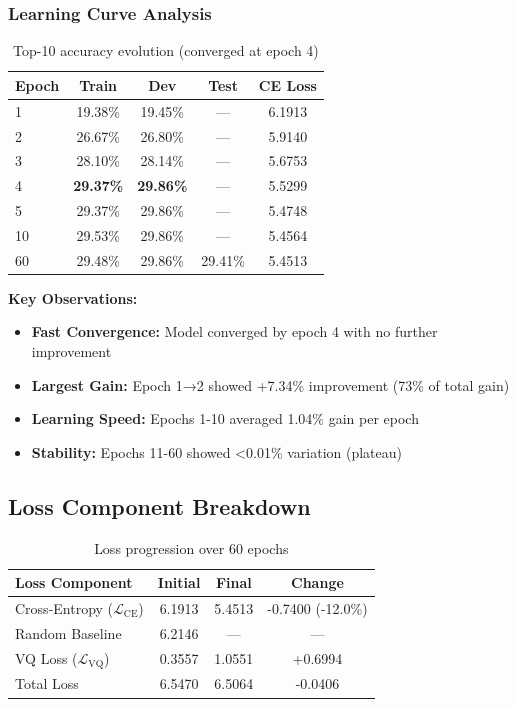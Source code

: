 \documentclass[12pt,a4paper]{article}
\begin{document}
\subsubsection{Learning Curve Analysis}
\begin{table}[H]
\centering
\begin{tabular}{lcccc}
\toprule
\textbf{Epoch} & \textbf{Train} & \textbf{Dev} & \textbf{Test} & \textbf{CE Loss} \\
\midrule
1 & 19.38\% & 19.45\% & — & 6.1913 \\
2 & 26.67\% & 26.80\% & — & 5.9140 \\
3 & 28.10\% & 28.14\% & — & 5.6753 \\
4 & \textbf{29.37\%} & \textbf{29.86\%} & — & 5.5299 \\
5 & 29.37\% & 29.86\% & — & 5.4748 \\
10 & 29.53\% & 29.86\% & — & 5.4564 \\
60 & 29.48\% & 29.86\% & 29.41\% & 5.4513 \\
\bottomrule
\end{tabular}
\caption{Top-10 accuracy evolution (converged at epoch 4)}
\end{table}

\textbf{Key Observations:}
\begin{itemize}
    \item \textbf{Fast Convergence:} Model converged by epoch 4 with no further improvement
    \item \textbf{Largest Gain:} Epoch 1→2 showed +7.34\% improvement (73\% of total gain)
    \item \textbf{Learning Speed:} Epochs 1-10 averaged 1.04\% gain per epoch
    \item \textbf{Stability:} Epochs 11-60 showed <0.01\% variation (plateau)
\end{itemize}

\subsection{Loss Component Breakdown}

\begin{table}[H]
\centering
\begin{tabular}{lccc}
\toprule
\textbf{Loss Component} & \textbf{Initial} & \textbf{Final} & \textbf{Change} \\
\midrule
Cross-Entropy ($\mathcal{L}_{\text{CE}}$) & 6.1913 & 5.4513 & -0.7400 (-12.0\%) \\
Random Baseline & 6.2146 & — & — \\
VQ Loss ($\mathcal{L}_{\text{VQ}}$) & 0.3557 & 1.0551 & +0.6994 \\
Total Loss & 6.5470 & 6.5064 & -0.0406 \\
\bottomrule
\end{tabular}
\caption{Loss progression over 60 epochs}
\end{table}
\end{document}
